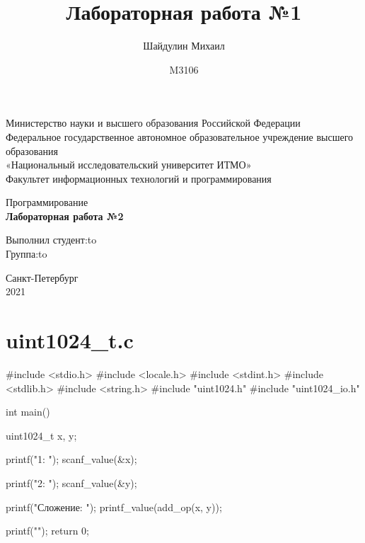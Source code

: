 \documentclass[a4paper,14pt]{article}
\author{Шайдулин Михаил}
\date{M3106}
\title{\textbf{Лабораторная работа №1}}
\begin{document}
\begin{titlepage}
\newpage

\begin{center}
Министерство науки и высшего образования Российской Федерации\\
Федеральное государственное автономное образовательное учреждение высшего образования\\
«Национальный исследовательский университет ИТМО»\\
Факультет информационных технологий и программирования\\
\end{center}

\vspace{\fill}

\begin{center}
Программирование\\
\textbf{Лабораторная работа №2}\\
\end{center}

\vspace{\fill}

\newbox{\lbox}
\newlength{\maxl}
\setlength{\maxl}{\wd\lbox}
\hfill\parbox{14cm}{
\hspace*{5cm}Выполнил студент:\hfill\hbox to\\
\hspace*{5cm}Группа:\hfill\hbox to\\
}


\vspace{8em}

\begin{center}
Санкт-Петербург \\2021
\end{center}

\end{titlepage}

\section{uint1024\_t.c}
\begin{python}
#include <stdio.h>
#include <locale.h>
#include <stdint.h>
#include <stdlib.h>
#include <string.h>
#include "uint1024.h"
#include "uint1024_io.h"


int main() {
    uint1024_t x, y;

    printf("1: "); scanf_value(&x);

    printf("2: "); scanf_value(&y);

    printf("Сложение:   "); printf_value(add_op(x, y));

    printf("\n");
    return 0;
}
\end{python}
\end{document}
